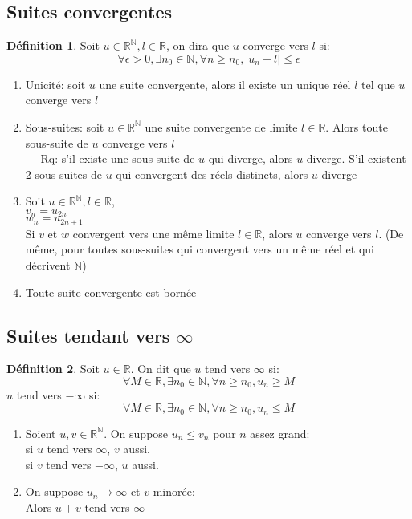 \documentclass[fleqn]{article}
\theoremstyle{definition} \newtheorem*{defi}{D\'efinition}
\theoremstyle{definition} \newtheorem*{theo}{Th\'eor\`eme}
\begin{document}
\subsection{Suites convergentes}
\begin{defi}
	Soit $u \in \mathbb{R}^\mathbb{N}, l \in \mathbb{R}$, on dira que $u$ converge vers $l$ si:
	\[\forall \epsilon > 0, \exists n_0 \in \mathbb{N}, \forall n \geq n_0, |u_n - l| \leq \epsilon\]
\end{defi}
\begin{enumerate}
	\item Unicit\'e: soit $u$ une suite convergente, alors il existe un unique r\'eel $l$ tel que $u$ converge vers $l$
	\item Sous-suites: soit $u \in \mathbb{R}^\mathbb{N}$ une suite convergente de limite $l \in \mathbb{R}$. Alors toute sous-suite
	de $u$ converge vers $l$ \\
	$\quad$ Rq: s'il existe une sous-suite de $u$ qui diverge, alors $u$ diverge. S'il existent 2 sous-suites de $u$ qui convergent des
	r\'eels distincts, alors $u$ diverge
	\item Soit $u \in \mathbb{R}^\mathbb{N}, l \in \mathbb{R}$, \\
			$v_n = u_{2n}$ \\
			$w_n = u_{2n+1}$ \\
		Si $v$ et $w$ convergent vers une m\^eme limite $l \in \mathbb{R}$, alors $u$ converge vers $l$.
		(De m\^eme, pour toutes sous-suites qui convergent vers un m\^eme r\'eel et qui d\'ecrivent $\mathbb{N}$)
	\item Toute suite convergente  est born\'ee
\end{enumerate}

\subsection{Suites tendant vers $\infty$}
\begin{defi}
	Soit $u \in \mathbb{R}$. On dit que $u$ tend vers $\infty$ si:
	\[\forall M \in \mathbb{R}, \exists n_0 \in \mathbb{N}, \forall n \geq n_0, u_n \geq M\]
	$u$ tend vers $-\infty$ si:
	\[\forall M \in \mathbb{R}, \exists n_0 \in \mathbb{N}, \forall n \geq n_0, u_n \leq M\]
\end{defi}
\begin{enumerate}
	\item Soient $u, v \in \mathbb{R}^\mathbb{N}$. On suppose $u_n \leq v_n$ pour $n$ assez grand: \\
		si $u$ tend vers $\infty$, $v$ aussi. \\
		si $v$ tend vers $-\infty$, $u$ aussi.
	\item On suppose $u_n \rightarrow \infty$ et $v$ minor\'ee: \\
		Alors $u+v$ tend vers $\infty$
\end{enumerate}
\end{document}
